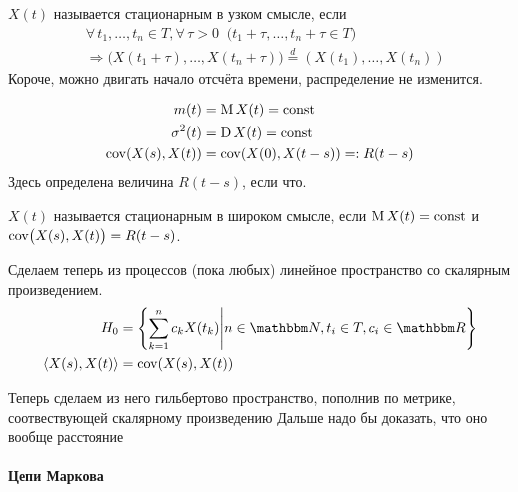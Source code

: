 \documentclass[12pt, timbord]{../../../notes}
\begin{document}
\begin{defn}\label{defn:proc::const::narr}
  $X(t)$ называется стационарным в узком смысле, если
  \[
    \begin{split}
      &\forall\, t_1, \dotsc, t_n \in T, \forall\, \tau>0\;\; \bigl( t_1 + \tau, \dotsc, t_n + \tau \in T \bigr) \\
      & \Rightarrow 
      \bigl(X(t_1 + \tau), \dotsc, X(t_n + \tau)\bigr) \overset{d}{=} \left( X(t_1), \dotsc, X(t_n)\right)
    \end{split}
  \]
  Короче, можно двигать начало отсчёта времени, распределение не изменится.
\end{defn}

\begin{cor}\label{cor:proc::const::exp}
  \begin{align*}
    m(t) &= \operatorname{M} X(t) = \mathrm{const} \\
    \sigma^2(t) &= \operatorname{D} X(t) = \mathrm{const} \\
    \operatorname{cov} (X(s), X(t)) &= \operatorname{cov} (X(0), X(t-s) ) =: R(t-s)
  \end{align*}
  Здесь определена величина $R(t-s)$, если что.
\end{cor}

\begin{defn}\label{defn:proc::const::wide}
  $X(t)$ называется стационарным в широком смысле, если
  $\operatorname{M} X(t) = \mathrm{const}$ и $\operatorname{cov} \bigl(X(s), X(t)\bigr) = R(t-s)$.
\end{defn}

Сделаем теперь из процессов (пока любых) линейное пространство со скалярным произведением.
\begin{align}
  H_0 &= \left\{\sum_{k=1}^{n} c_k X(t_k) \middle| n \in \N, t_i \in T, c_i \in \R\right\} \\
  \langle X(s), X(t) \rangle &= \cov (X(s), X(t)) 
\end{align}

Теперь сделаем из него гильбертово пространство, пополнив по метрике, соотвествующей скалярному произведению
Дальше надо бы доказать, что оно вообще расстояние


\paragraph{Цепи Маркова}
\label{par:proc::markchain}
\end{document}

